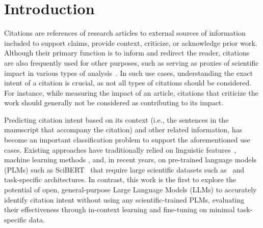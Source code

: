 \section{Introduction}
\label{sec:intro}

Citations are references of research articles to external sources of information included to support claims, provide context, criticize, or acknowledge prior work. Although their primary function is to inform and redirect the reader, citations are also frequently used for other purposes, such as serving as proxies of scientific impact in various types of analysis~\citep{KanellosVSDV21}. In such use cases, understanding the exact intent of a citation is crucial, as not all types of citations should be considered. For instance, while measuring the impact of an article, citations that criticize the work should generally not be considered as contributing to its impact.   

Predicting citation intent based on its context (i.e., the sentences in the manuscript that accompany the citation) and other related information, has become an important classification problem to support the aforementioned use cases. Existing approaches have traditionally relied on linguistic features~\citep{JKH2018}, machine learning methods \citep{TST2006a}, and, in recent years, on pre-trained language models (PLMs) such as SciBERT~\citep{BLC2019} that require large scientific datasets such as~\citep{s2orc} and task-specific architectures. In contrast, this work is the first to explore the potential of open, general-purpose Large Language Models (LLMs) to accurately identify citation intent without using any scientific-trained PLMs, evaluating their effectiveness through in-context learning and fine-tuning on minimal task-specific data. 


